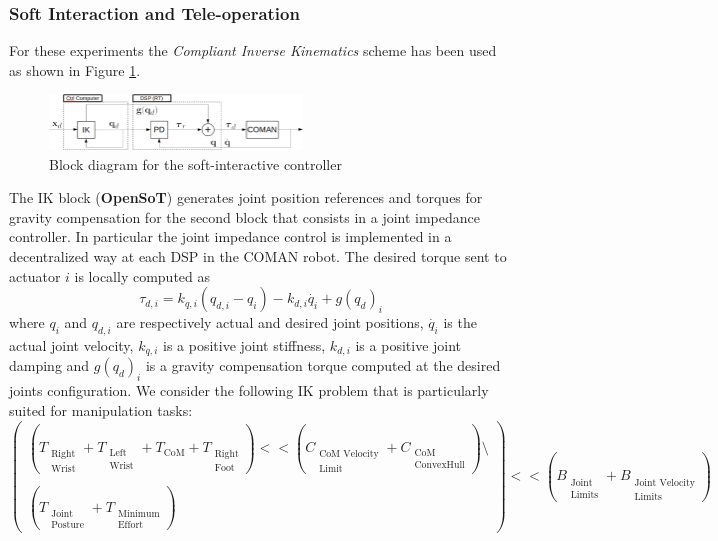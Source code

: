 \subsubsection{Soft Interaction and Tele-operation}
\cite{Settimi2014-uo}
For these experiments the \emph{Compliant Inverse Kinematics} scheme has been used as shown in Figure \ref{soft_interaction_block_diagram}.
\begin{figure}[!h]
\vspace{2 mm}
\centering
\includegraphics[width=0.6\textwidth]{images/soft_interaction/ctrl_scheme.eps}
\caption{Block diagram for the soft-interactive controller}
\label{soft_interaction_block_diagram}
\end{figure}
The IK block (\textbf{OpenSoT}) generates joint position references and torques for gravity compensation for the second block that consists in a joint impedance controller. In particular the joint impedance control is implemented in a decentralized way at each DSP in the COMAN robot. The desired torque sent to actuator $i$ is locally computed as
\begin{equation}
    \tau_{d,i} = k_{q,i} (q_{d,i} - q_i) -k_{d,i}\dot{q_i} + g(q_d)_i
    \label{joint_impedance_control}
\end{equation}
where $q_i$ and $q_{d,i}$ are respectively actual and desired joint positions, $\dot{q_i}$ is the  actual joint velocity, $k_{q,i}$ is a positive joint stiffness, $k_{d,i}$ is a positive joint damping and $g(q_d)_i$ is a gravity compensation torque computed at the desired joints configuration.
We consider the following IK problem that is particularly suited for manipulation tasks:
\begin{equation}
\begin{pmatrix}
\left(T_{\substack{\text{Right}\\\text{Wrist}}} + T_{\substack{\text{Left}\\\text{Wrist}}} + T_\text{CoM} + T_{\substack{\text{Right}\\\text{Foot}}}\right) << 
\left(C_{\substack{\text{CoM Velocity}\\\text{Limit}}} + C_{\substack{\text{CoM}\\\text{ConvexHull}}} \right)\setminus\\ 
\\
\left(T_{\substack{\text{Joint}\\\text{Posture}}} + T_{\substack{\text{Minimum}\\\text{Effort}}} \right)
\end{pmatrix}
<< \left(B_{\substack{\text{Joint}\\\text{Limits}}} + B_{\substack{\text{Joint Velocity}\\\text{Limits}}}\right)
\end{equation}
